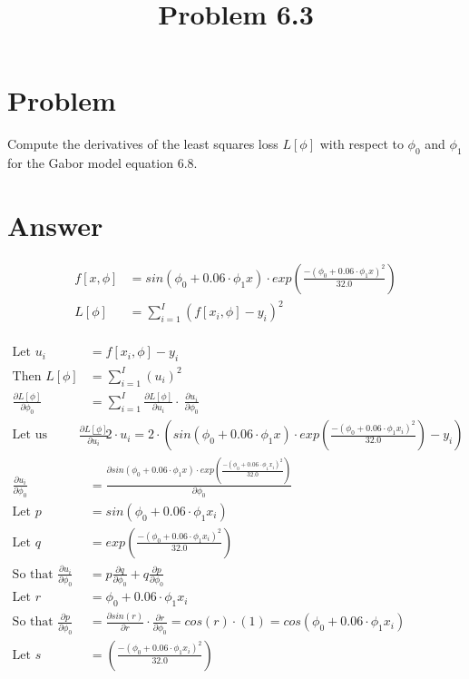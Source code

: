 \documentclass{article}
\title{Problem 6.3}
\begin{document}
\section{Problem}

Compute the derivatives of the least squares loss $ L [ \phi ] $  with respect to $ \phi_0 $ and $\phi_1$ for the Gabor model equation 6.8. 

\section{Answer}

\begin{align}
    f[x,\phi] &= sin(\phi_0 + 0.06 \cdot \phi_1x) \cdot exp  \left( \frac{-(\phi_0 + 0.06 \cdot \phi_1x)^2}{32.0} \right)
    \\
    L[\phi]   &= \sum_{i=1}^{I} (f[x_i, \phi]-y_i)^2
    \\
\end{align}

\begin{align*}
\text{Let } u_i &= f[x_i, \phi]-y_i \\
\text{Then } L [\phi] &= \sum_{i=1}^{I} (u_i)^2 \\
\frac{\partial{L[\phi]}}{\partial{\phi_0}} &= \sum_{i=1}^{I}  \frac{\partial{L[\phi]}}{\partial{u_i}} \cdot \
 \frac{\partial{u_i}}{\partial{\phi_0}}
 \\
 \text{Let us break it down } \frac{\partial{L[\phi]}}{\partial{u_i}} &= 2 \cdot u_i = 2 \cdot \left( sin(\phi_0 + 0.06 \cdot \phi_1x) \cdot exp  \left( \frac{-(\phi_0 + 0.06 \cdot \phi_1x_i)^2}{32.0} \right) - y_i \right)
 \\
 \frac{\partial{u_i}}{\partial{\phi_0}} &= \frac{\partial{sin(\phi_0 + 0.06 \cdot \phi_1x) \cdot exp  \left( \frac{-(\phi_0 + 0.06 \cdot \phi_1x_i)^2}{32.0} \right)}}{\partial{\phi_0}} \\
 \text{Let } p &= sin(\phi_0 + 0.06 \cdot \phi_1x_i) \\
 \text{Let } q &= exp  \left( \frac{-(\phi_0 + 0.06 \cdot \phi_1x_i)^2}{32.0} \right) \\
 \text{So that } \frac{\partial{u_i}}{\partial{\phi_0}} &= p\frac{\partial{q}}{\partial{\phi_0}} + q \frac{\partial{p}}{\partial{\phi_0}}
 \\
 \text{Let } r &= \phi_0 + 0.06 \cdot \phi_1 x_i
 \\
 \text{So that } \frac{\partial{p}}{\partial{\phi_0}} &= \frac{\partial{sin(r)}}{\partial{r}} \cdot \frac{\partial{r}}{\partial{\phi_0}} = cos (r) \cdot (1) = cos(\phi_0 + 0.06\cdot \phi_1 x_i)
 \\
 \text{Let } s &= \left( \frac{-(\phi_0 + 0.06 \cdot \phi_1x_i)^2}{32.0} \right)
\end{align*}
\end{document}
